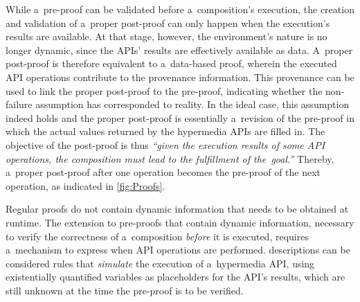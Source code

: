 While a~pre-proof can be validated before a~composition's execution,
the creation and validation of a~proper post-proof can only happen
when the execution's results are available.
At that stage, however, the environment's nature is no longer dynamic,
since the APIs' results are effectively available as data.
A~proper post-proof is therefore equivalent to a~data-based proof,
wherein the executed API operations contribute to the provenance information.
This provenance can be used to link the proper post-proof to the pre-proof,
indicating whether the non-failure assumption has corresponded to reality.
In the ideal case, this assumption indeed holds
and the proper post-proof is essentially a~revision of the pre-proof
in which the actual values returned by the hypermedia APIs are filled in.
The objective of the post-proof is thus
\emph{``given the execution results of some API operations,
      the composition must lead to the fulfillment of the~goal.''}
Thereby, a~proper post-proof after one operation
becomes the pre-proof of the next operation,
as indicated in \cref{fig:Proofs}.

Regular proofs do not contain dynamic information that needs to be obtained at runtime.
The extension to pre-proofs that contain dynamic information,
necessary to verify the correctness of a~composition \emph{before} it is executed,
requires a~mechanism to express when API operations are performed.
\restdesc descriptions can be considered rules
that \emph{simulate} the execution of a~hypermedia API,
using existentially quantified variables as placeholders for the API's results,
which are still unknown at the time the pre-proof is to be verified.

